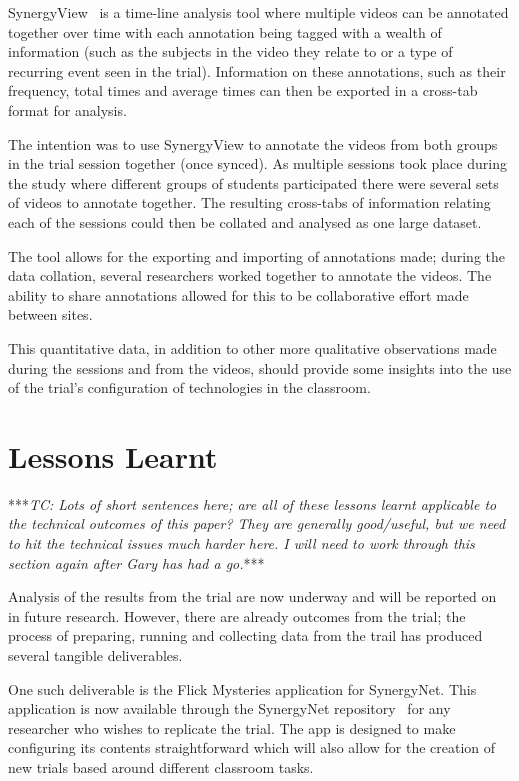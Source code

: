 \documentclass[a4paper,11pt]{article}
\begin{document}
SynergyView~\cite{kyaw:2010} is a time-line analysis tool where multiple videos can be annotated together over time with each annotation being tagged with a wealth of information (such as the subjects in the video they relate to or a type of recurring event seen in the trial).
Information on these annotations, such as their frequency, total times and average times can then be exported in a cross-tab format for analysis.

The intention was to use SynergyView to annotate the videos from both groups in the trial session together (once synced).
As multiple sessions took place during the study where different groups of students participated there were several sets of videos to annotate together.
The resulting cross-tabs of information relating each of the sessions could then be collated and analysed as one large dataset.

The tool allows for the exporting and importing of annotations made; during the data collation, several researchers worked together to annotate the videos.
The ability to share annotations allowed for this to be collaborative effort made between sites. 

This quantitative data, in addition to other more qualitative observations made during the sessions and from the videos, should provide some insights into the use of the trial's configuration of technologies in the classroom.


\section{Lessons Learnt}

***{\emph{TC: Lots of short sentences here; are all of these lessons learnt applicable to the technical outcomes of this paper? They are generally good/useful, but we need to hit the technical issues much harder here. I will need to work through this section again after Gary has had a go.}}***

Analysis of the results from the trial are now underway and will be reported on in future research.
However, there are already outcomes from the trial; the process of preparing, running and collecting data from the trail has produced several tangible deliverables.

One such deliverable is the Flick Mysteries application for SynergyNet.
This application is now available through the SynergyNet repository~\cite{hatch:2011} for any researcher who wishes to replicate the trial.
The app is designed to make configuring its contents straightforward which will also allow for the creation of new trials based around different classroom tasks.
\end{document}
